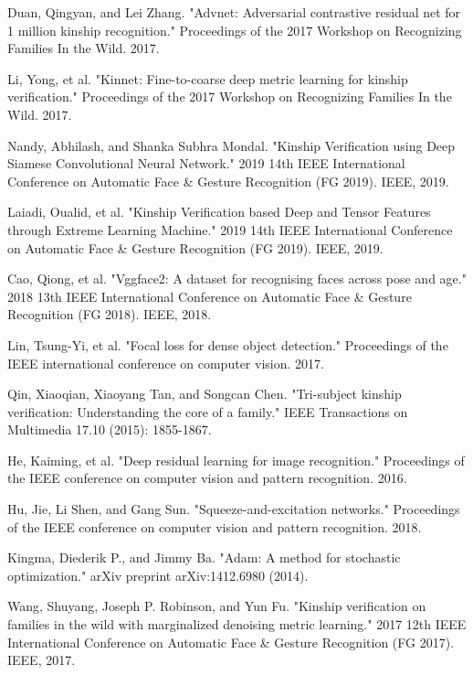 \documentclass[a4paper, 10pt, conference]{ieeeconf}      %
\begin{document}
\begin{thebibliography}{99}
Duan, Qingyan, and Lei Zhang. "Advnet: Adversarial contrastive residual net for 1 million kinship recognition." Proceedings of the 2017 Workshop on Recognizing Families In the Wild. 2017.

Li, Yong, et al. "Kinnet: Fine-to-coarse deep metric learning for kinship verification." Proceedings of the 2017 Workshop on Recognizing Families In the Wild. 2017.

Nandy, Abhilash, and Shanka Subhra Mondal. "Kinship Verification using Deep Siamese Convolutional Neural Network." 2019 14th IEEE International Conference on Automatic Face \& Gesture Recognition (FG 2019). IEEE, 2019.

Laiadi, Oualid, et al. "Kinship Verification based Deep and Tensor Features through Extreme Learning Machine." 2019 14th IEEE International Conference on Automatic Face \& Gesture Recognition (FG 2019). IEEE, 2019.


Cao, Qiong, et al. "Vggface2: A dataset for recognising faces across pose and age." 2018 13th IEEE International Conference on Automatic Face \& Gesture Recognition (FG 2018). IEEE, 2018.


Lin, Tsung-Yi, et al. "Focal loss for dense object detection." Proceedings of the IEEE international conference on computer vision. 2017.


Qin, Xiaoqian, Xiaoyang Tan, and Songcan Chen. "Tri-subject kinship verification: Understanding the core of a family." IEEE Transactions on Multimedia 17.10 (2015): 1855-1867.

He, Kaiming, et al. "Deep residual learning for image recognition." Proceedings of the IEEE conference on computer vision and pattern recognition. 2016.

Hu, Jie, Li Shen, and Gang Sun. "Squeeze-and-excitation networks." Proceedings of the IEEE conference on computer vision and pattern recognition. 2018.

Kingma, Diederik P., and Jimmy Ba. "Adam: A method for stochastic optimization." arXiv preprint arXiv:1412.6980 (2014).

Wang, Shuyang, Joseph P. Robinson, and Yun Fu. "Kinship verification on families in the wild with marginalized denoising metric learning." 2017 12th IEEE International Conference on Automatic Face \& Gesture Recognition (FG 2017). IEEE, 2017.


\end{thebibliography}
\end{document}
